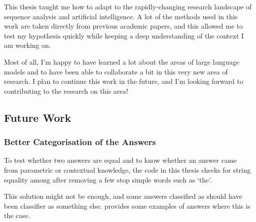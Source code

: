 This thesis taught me how to adapt to the rapidly-changing research landscape of sequence analysis and artificial intelligence.
A lot of the methods used in this work are taken directly from previous academic papers, and this allowed me to test my hypothesis quickly while keeping a deep understanding of the context I am working on.

Most of all, I'm happy to have learned a lot about the areas of large language models and  to have been able to collaborate a bit in this very new area of research.
I plan to continue this work in the future, and I'm looking forward to contributing to the research on this area!

\subsection{Future Work}

\subsubsection{Better Categorisation of the Answers}
\label{other_problems}

To test whether two answers are equal and to know whether an answer came from parametric or contextual knowledge, the code in this thesis checks for string equality among after removing a few stop simple words such as `the'.

This solution might not be enough, and some answers classified as \Other{} should have been classifier as something else.
 provides some examples of answers where this is the case.

